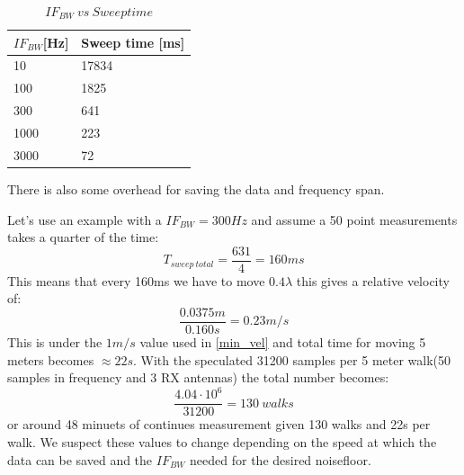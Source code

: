 \begin{table}[H]
\centering
\label{my-label}
\begin{tabular}{|l|l|}
\hline
$IF_{BW}${[}Hz{]} & Sweep time {[}ms{]} \\
\hline
10              & 17834               \\
100             & 1825                \\
300             & 641                 \\
1000            & 223                 \\
3000            & 72            \\
\hline 
\end{tabular}
\caption{$IF_{BW} \ vs \ Sweep time$}
\end{table}

There is also some overhead for saving the data and frequency span.


Let's use an example with a $IF_{BW} = 300Hz$ and assume a 50 point measurements takes a quarter of the time:
\begin{equation}
T_{sweep \ total} = \frac{631}{4} = 160ms
\end{equation}
This means that every 160ms we have to move $0.4 \lambda$ this gives a relative velocity of:
\begin{equation}
\frac{0.0375m}{0.160s} = 0.23 m/s
\end{equation}
This is under the $1m/s$ value used in \autoref{min_vel}
and total time for moving 5 meters becomes $\approx 22s$.
With the speculated 31200 samples per 5 meter walk(50 samples in frequency and 3 RX antennas) the total number becomes:
\begin{equation}
\frac{4.04 \cdot 10^6}{31200} = 130 \ walks
\end{equation}
or around 48 minuets of continues measurement given 130 walks and 22s per walk. We suspect these values to change depending on the speed at which the data can be saved and the $IF_{BW}$ needed for the desired noisefloor.

